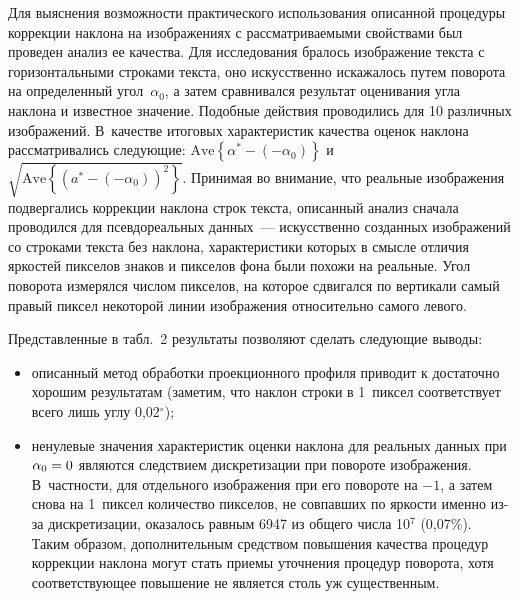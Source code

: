 \begin{multicols}{2}
      Для выяснения возможности практического использования описанной процедуры 
коррекции накло\-на на изображениях с рассматриваемыми свойствами был проведен 
анализ ее качества. Для исследования бралось изображение текста с горизонтальными 
строками текста, оно искусственно искажалось путем поворота на определенный 
угол~$\alpha_0$, а затем сравнивался результат оценивания угла наклона и известное 
значение. Подобные действия проводились для 10 различных изоб\-ра\-же\-ний. В~качестве 
итоговых характеристик качества оценок наклона рассматривались следующие: $\mathrm{Ave} 
\left\{ \alpha^*-(-\alpha_0)\right\}$ и $\sqrt{\mathrm{Ave}\left\{ (a^*-(-\alpha_0))^2\right\}}$. 
При\-нимая 
во внимание, что реальные изображения подвергались коррекции наклона строк текс\-та,\linebreak 
описанный анализ сначала проводился для псев\-дореальных данных~--- искусственно 
созданных изоб\-ра\-же\-ний со строками текста без наклона, характеристики которых в 
смыс\-ле отличия яркостей пикселов знаков и пикселов фона были похожи на реальные. 
Угол поворота измерялся числом пикселов, на которое сдвигался по вертикали самый 
правый пиксел некоторой линии изображения относительно самого левого.


      
      Представленные в табл.~2 результаты позволяют сделать следующие выводы:
      \begin{itemize}
\item описанный метод обработки проекционного профиля приводит к достаточно 
хорошим результатам (заметим, что наклон строки в 1~пиксел соответствует всего 
лишь углу 0,02$^\circ$); 
\item ненулевые значения характеристик оценки наклона для реальных данных при 
$\alpha_0\hm=0$ являются следствием дискретизации при повороте изображения. 
В~частности, для отдельного изображения при его повороте на $-1$, а затем снова на 
1~пиксел количество пикселов, не совпавших по яркости именно из-за дискретизации, 
оказалось равным 6947 из общего числа 10$^7$ (0,07\%). Таким образом, 
дополнительным средством повышения качества процедур коррекции наклона могут 
стать приемы уточнения процедур поворота, хотя соответствующее повышение не 
является столь уж существенным.
      \end{itemize}
      

\end{multicols}
